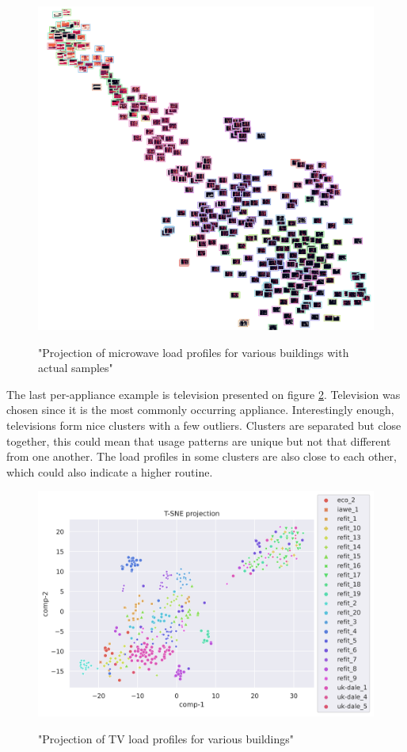 \begin{figure}[H]
	\centering
	\caption{"Projection of microwave load profiles for various buildings with actual samples"}
	\includegraphics[width=.9\textwidth]{Figures/TSNE/TSNE_per_appliance/all/img_scatter_allmicrowave.png}
	\label{fig:tsne_pa_img_scatter_all_microwave}
\end{figure}

The last per-appliance example is television presented on figure \ref{fig:tsne_pa_scatter_all_tv}. 
Television was chosen since it is the most commonly occurring appliance.
Interestingly enough, televisions form nice clusters with a few outliers.
Clusters are separated but close together, this could mean that usage patterns are unique
but not that different from one another. 
The load profiles in some clusters are also close to each other, which could also indicate 
a higher routine.

\begin{figure}[H]
	\centering
	\caption{"Projection of TV load profiles for various buildings"}
	\includegraphics[width=1.2\textwidth]{Figures/TSNE/TSNE_per_appliance/all/scatter_all_television.png}
	\label{fig:tsne_pa_scatter_all_tv}
\end{figure}

